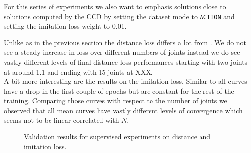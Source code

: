 For this series of experiments we also want to emphasis solutions close to solutions computed by the CCD by setting the dataset mode to \texttt{ACTION} and setting the imitation loss weight to 0.01. 

Unlike as in the previous section the distance loss differs a lot from . We do not see a steady increase in loss over different numbers of joints instead we do see vastly different levels of final distance loss performances starting with two joints at around 1.1 and ending with 15 joints at XXX.\\
A bit more interesting are the results on the imitation loss. Similar to  all curves have a drop in the first couple of epochs but are constant for the rest of the training. Comparing those curves with respect to the number of joints we observed that all mean curves have vastly different levels of convergence which seems not to be linear correlated with $N$.


\begin{figure}
    \begin{center}
        \hfill
    \end{center}
    \caption[Supervised Distance and Imitation Loss]{Validation results for supervised experiments on distance and imitation loss. }
    \label{fig:supervised_imitation}
\end{figure}

